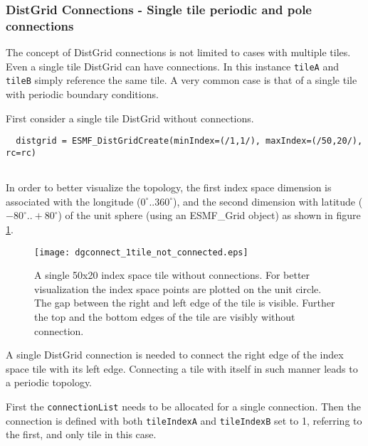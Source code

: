    \subsubsection{DistGrid Connections - Single tile periodic and pole connections}
   
   The concept of DistGrid connections is not limited to cases with multiple
   tiles. Even a single tile DistGrid can have connections. In this instance
   {\tt tileA} and {\tt tileB} simply reference the same tile. A very common
   case is that of a single tile with periodic boundary conditions.
  
   First consider a single tile DistGrid without connections. 

 \begin{verbatim}
  distgrid = ESMF_DistGridCreate(minIndex=(/1,1/), maxIndex=(/50,20/), rc=rc)
 
\end{verbatim}
 

   In order to better visualize the topology, the first index space
   dimension is associated with the longitude ($0^{\circ}..360^{\circ}$), and
   the second dimension with latitude ($-80^{\circ}..+80^{\circ}$) of the unit
   sphere (using an ESMF\_Grid object) as shown in figure 
   \ref{fig:dgconnect_1tile_not_connected}.
  
  
   \begin{figure}[h]
     \caption{A single 50x20 index space tile without connections. For better
       visualization the index space points are plotted on the unit circle.
       The gap between the right and left edge of the tile is visible. Further
       the top and the bottom edges of the tile are visibly without
       connection.}
     \centering
     \texttt{[image: dgconnect\_1tile\_not\_connected.eps]}
     \label{fig:dgconnect_1tile_not_connected}
   \end{figure}
  
  
   A single DistGrid connection is needed to connect the right edge of the 
   index space tile with its left edge. Connecting a tile with itself in such
   manner leads to a periodic topology.
  
   First the {\tt connectionList} needs to be allocated for a single connection.
   Then the connection is defined with both {\tt tileIndexA} and 
   {\tt tileIndexB} set to 1, referring to the first, and only tile in this case. 

